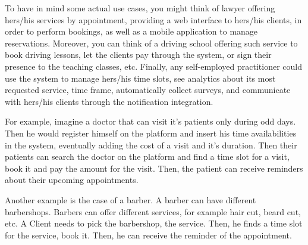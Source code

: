 \documentclass{article}
\begin{document}
To have in mind some actual use cases, you might think of lawyer offering
hers/his services by appointment, providing a web interface to hers/his
clients, in order to perform bookings, as well as a mobile application to
manage reservations. Moreover, you can think of a driving school offering such
service to book driving lessons, let the clients pay through the system, or
sign their presence to the teaching classes, etc. Finally, any self-employed
practitioner could use the system to manage hers/his time slots, see analytics
about its most requested service, time frame, automatically collect surveys,
and communicate with hers/his clients through the notification integration.

For example, imagine a doctor that can visit it's patients only during odd
days. Then he would register himself on the platform and insert his time 
availabilities in the system, eventually adding the cost of a visit and it's
duration. Then their patients can search the doctor on the platform and find a time
slot for a visit, book it and pay the amount for the visit. Then, the patient can receive reminders about their upcoming appointments.

Another example is the case of a barber. A barber can have different barbershops. Barbers can offer different services, for example hair cut, beard cut, etc. A Client needs to pick the barbershop, the service. Then, he finds a time slot for the service, book it. Then, he can receive the reminder of the appointment.


\end{document}
